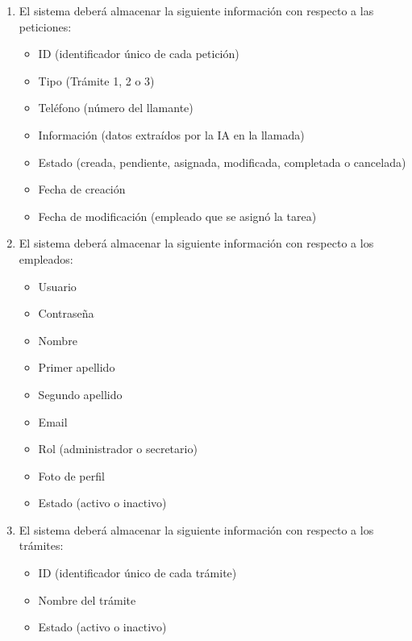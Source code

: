 \documentclass[12pt, a4paper, twoside]{report}
\begin{document}
\begin{enumerate}
            \item[RFI1.] El sistema deberá almacenar la siguiente información con respecto a las peticiones:
                \begin{itemize}
                    \item ID (identificador único de cada petición)
                    \item Tipo (Trámite 1, 2 o 3)
                    \item Teléfono (número del llamante)
                    \item Información (datos extraídos por la IA en la llamada) 
                    \item Estado (creada, pendiente, asignada, modificada, completada o cancelada)
                    \item Fecha de creación
                    \item Fecha de modificación (empleado que se asignó la tarea)
                \end{itemize}
            \item[RFI2.] El sistema deberá almacenar la siguiente información con respecto a los empleados:
                \begin{itemize}  
                    \item Usuario
                    \item Contraseña
                    \item Nombre
                    \item Primer apellido
                    \item Segundo apellido
                    \item Email
                    \item Rol (administrador o secretario)
                    \item Foto de perfil
                    \item Estado (activo o inactivo)
                \end{itemize}
            \item[RFI3.] El sistema deberá almacenar la siguiente información con respecto a los trámites:
                \begin{itemize}  
                    \item ID (identificador único de cada trámite)
                    \item Nombre del trámite
                    \item Estado (activo o inactivo)
                \end{itemize}
                

\end{enumerate}
\end{document}
